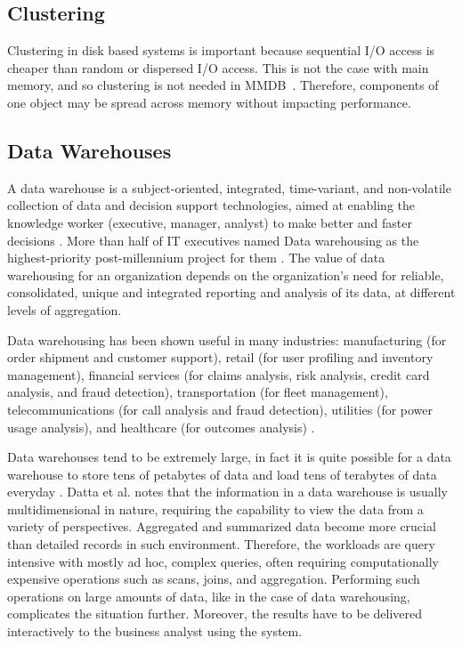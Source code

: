 \documentclass[12pt,a4paper]{article}
\begin{document}
\subsection{Clustering}
Clustering in disk based systems is important because sequential I/O access is cheaper than random or dispersed I/O access. This is not the case with main
memory, and so clustering is not needed in MMDB~\cite{garcia1992main, moldovan2008databases}. Therefore, components of one object may be spread across memory
without impacting performance.




\subsection{Data Warehouses}
\label{SEC-WAREHOUSES}
A data warehouse is a subject-oriented, integrated, time-variant, and non-volatile collection of data and decision support technologies, aimed at enabling the
knowledge worker (executive, manager, analyst) to make better and faster decisions \cite{560407, 248616}. More than half of IT executives named Data warehousing
as the highest-priority post-millennium project for them \cite{sen2005comparison}. The value of data warehousing for an organization depends on the
organization's need for reliable, consolidated, unique and integrated reporting and analysis of its data, at different levels of aggregation.


Data warehousing has been shown useful in many industries: manufacturing (for order shipment and customer support), retail (for user profiling and inventory
management), financial services (for claims analysis, risk analysis, credit card analysis, and fraud detection), transportation (for fleet management),
telecommunications (for call analysis and fraud detection), utilities (for power usage analysis), and healthcare (for outcomes analysis) \cite{248616}.


Data warehouses tend to be extremely large, in fact it is quite possible for a data warehouse to store tens of petabytes of data and load tens of terabytes of
data everyday \cite{thusoo2010data}. Datta et al. \cite {628286} notes that the information in a data warehouse is usually multidimensional in nature, requiring
the capability to view the data from a variety of perspectives. Aggregated and summarized data become more crucial than detailed records in such environment.
Therefore, the workloads are query intensive with mostly ad hoc, complex queries, often requiring computationally expensive operations such as scans, joins, and
aggregation. Performing such operations on large amounts of data, like in the case of data warehousing, complicates the situation further. Moreover, the results
have to be delivered interactively to the business analyst using the system.
\end{document}
